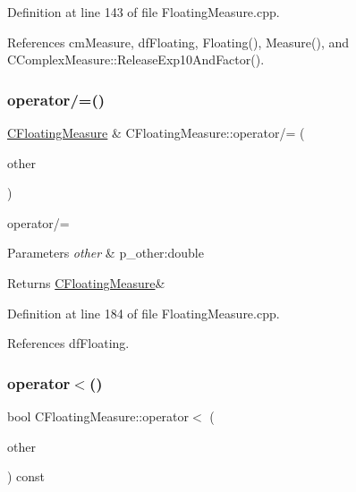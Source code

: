 Definition at line 143 of file Floating\+Measure.\+cpp.



References cm\+Measure, df\+Floating, Floating(), Measure(), and C\+Complex\+Measure\+::\+Release\+Exp10\+And\+Factor().

\mbox{\label{classCFloatingMeasure_a2ba332fa822922d51866e4361db1677b}} 
\subsubsection{\texorpdfstring{operator/=()}{operator/=()}\hspace{0.1cm}{\footnotesize\ttfamily [2/2]}}
{\footnotesize\ttfamily \hyperlink{classCFloatingMeasure}{C\+Floating\+Measure} \& C\+Floating\+Measure\+::operator/= (\begin{DoxyParamCaption}\item[{const double \&}]{other }\end{DoxyParamCaption})}



operator/= 


\begin{DoxyParams}{Parameters}
{\em other} & p\+\_\+other\+:double \\
\hline
\end{DoxyParams}
\begin{DoxyReturn}{Returns}
\hyperlink{classCFloatingMeasure}{C\+Floating\+Measure}\& 
\end{DoxyReturn}


Definition at line 184 of file Floating\+Measure.\+cpp.



References df\+Floating.

\mbox{\label{classCFloatingMeasure_a35d506664a6a72856d56cbf18ea9d2a4}} 
\subsubsection{\texorpdfstring{operator$<$()}{operator<()}}
{\footnotesize\ttfamily bool C\+Floating\+Measure\+::operator$<$ (\begin{DoxyParamCaption}\item[{const \hyperlink{classCFloatingMeasure}{C\+Floating\+Measure} \&}]{other }\end{DoxyParamCaption}) const}



